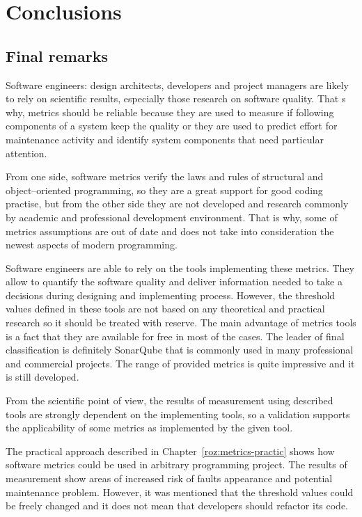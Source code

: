 \chapter{Conclusions} \label{roz:conclusion}

\section{Final remarks}
Software engineers: design architects, developers and project managers are likely to rely on scientific results, especially those research on software quality. That s why, metrics should be reliable because they are used to measure if following components of a system keep the quality or they are used to predict effort for maintenance activity and identify system components that need particular attention. 

From one side, software metrics verify the laws and rules of structural and object--oriented programming, so they are a great support for good coding practise, but from the other side they are not developed and research commonly by academic and professional development environment. That is why, some of metrics assumptions are out of date and does not take into consideration the newest aspects of modern programming.

Software engineers are able to rely on the tools implementing these metrics. They allow to quantify the software quality and deliver information needed to take a decisions during designing and implementing process. However, the threshold values defined in these tools are not based on any theoretical and practical research so it should be treated with reserve. The main advantage of metrics tools is a fact that they are available for free in most of the cases. The leader of final classification is definitely SonarQube that is commonly used in many professional and commercial projects. The range of provided metrics is quite impressive and it is still developed. 

From the scientific point of view, the results of measurement using described tools are strongly dependent on the implementing tools, so a validation supports the applicability of some metrics as implemented by the given tool. 

The practical approach described in Chapter~\ref{roz:metrics-practic} shows how software metrics could be used in arbitrary programming project. The results of measurement show areas of increased risk of faults appearance and potential maintenance problem. However, it was mentioned that the threshold values could be freely changed and it does not mean that developers should refactor its code. 

